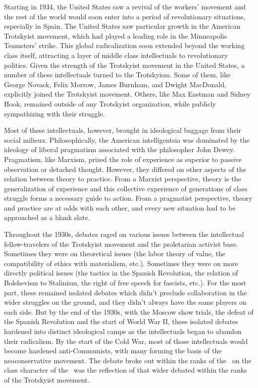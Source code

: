 Starting in 1934, the United States saw a revival of the workers’ movement and the rest of the world would soon enter into a period of revolutionary situations, especially in Spain. The United States saw particular growth in the American Trotskyist movement, which had played a leading role in the Minneapolis Teamsters’ strike. This global radicalization soon extended beyond the working class itself, attracting a layer of middle class intellectuals to revolutionary politics. Given the strength of the Trotskyist movement in the United States, a number of these intellectuals turned to the Trotskyism. Some of them, like George Novack, Felix Morrow, James Burnham, and Dwight MacDonald, explicitly joined the Trotskyist movement. Others, like Max Eastman and Sidney Hook, remained outside of any Trotskyist organization, while publicly sympathizing with their struggle.

Most of these intellectuals, however, brought in ideological baggage from their social milieux. Philosophically, the American intelligentsia was dominated by the ideology of liberal pragmatism associated with the philosopher John Dewey. Pragmatism, like Marxism, prized the role of experience as superior to passive observation or detached thought. However, they differed on other aspects of the relation between theory to practice. From a Marxist perspective, theory is the generalization of experience and this collective experience of generations of class struggle forms a necessary guide to action. From a pragmatist perspective, theory and practice are at odds with each other, and every new situation had to be approached as a blank slate.

Throughout the 1930s, debates raged on various issues between the intellectual fellow-travelers of the Trotskyist movement and the proletarian activist base. Sometimes they were on theoretical issues (the labor theory of value, the compatibility of ethics with materialism, etc.). Sometimes they were on more directly political issues (the tactics in the Spanish Revolution, the relation of Bolshevism to Stalinism, the right of free speech for fascists, etc.). For the most part, these remained isolated debates which didn’t preclude collaboration in the wider struggles on the ground, and they didn’t always have the same players on each side. But by the end of the 1930s, with the Moscow show trials, the defeat of the Spanish Revolution and the start of World War II, these isolated debates hardened into distinct ideological camps as the intellectuals began to abandon their radicalism. By the start of the Cold War, most of those intellectuals would become hardened anti-Communists, with many forming the basis of the neoconservative movement. The debate broke out within the ranks of the \SWP\ on the class character of the \USSR\ was the reflection of that wider debated within the ranks of the Trotskyist movement.


